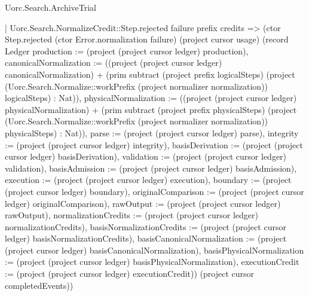 \begin{lexlean}{Uorc.Search.ArchiveTrial}
\begin{semanticmodule}
{{{          | Uorc.Search.NormalizeCredit::Step.rejected failure prefix credits => (ctor Step.rejected (ctor Error.normalization failure) (project cursor usage) (record Ledger {production := (project (project cursor ledger) production), canonicalNormalization := ((project (project cursor ledger) canonicalNormalization) + (prim subtract (project prefix logicalSteps) (project (Uorc.Search.Normalize::workPrefix (project normalizer normalization)) logicalSteps) : Nat)), physicalNormalization := ((project (project cursor ledger) physicalNormalization) + (prim subtract (project prefix physicalSteps) (project (Uorc.Search.Normalize::workPrefix (project normalizer normalization)) physicalSteps) : Nat)), parse := (project (project cursor ledger) parse), integrity := (project (project cursor ledger) integrity), basisDerivation := (project (project cursor ledger) basisDerivation), validation := (project (project cursor ledger) validation), basisAdmission := (project (project cursor ledger) basisAdmission), execution := (project (project cursor ledger) execution), boundary := (project (project cursor ledger) boundary), originalComparison := (project (project cursor ledger) originalComparison), rawOutput := (project (project cursor ledger) rawOutput), normalizationCredits := (project (project cursor ledger) normalizationCredits), basisNormalizationCredits := (project (project cursor ledger) basisNormalizationCredits), basisCanonicalNormalization := (project (project cursor ledger) basisCanonicalNormalization), basisPhysicalNormalization := (project (project cursor ledger) basisPhysicalNormalization), executionCredit := (project (project cursor ledger) executionCredit)}) (project cursor completedEvents))
}}}
\end{semanticmodule}
\end{lexlean}
